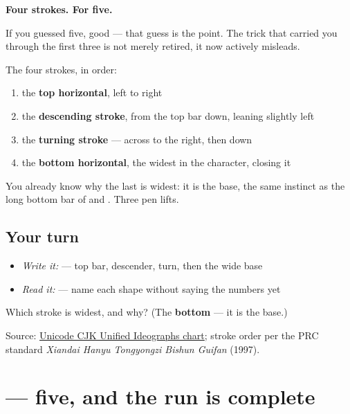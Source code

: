 \begin{quote}
\end{quote}

\textbf{Four strokes. For five.}

If you guessed five, good — that guess is the point. The trick that carried you through the first three is not merely retired, it now actively misleads.

The four strokes, in order:

\begin{enumerate}
\raggedright
  \item the \textbf{top horizontal}, left to right
  \item the \textbf{descending stroke}, from the top bar down, leaning slightly left
  \item the \textbf{turning stroke} — across to the right, then down
  \item the \textbf{bottom horizontal}, the widest in the character, closing it
\end{enumerate}

You already know why the last is widest: it is the base, the same instinct as the long bottom bar of  and . Three pen lifts.

\subsection*{Your turn}
\begin{itemize}
\raggedright
  \item \emph{Write it:}  — top bar, descender, turn, then the wide base
  \item \emph{Read it:}      — name each shape without saying the numbers yet
\end{itemize}

\begin{tcolorbox}[breakable,colback=teal!4,colframe=teal!35!black,title={Before you move on}]
Which stroke is widest, and why? (The \textbf{bottom} — it is the base.)

Source: \href{https://www.unicode.org/charts/PDF/U4E00.pdf}{Unicode CJK Unified Ideographs chart}; stroke order per the PRC standard \emph{Xiandai Hanyu Tongyongzi Bishun Guifan} (1997).
\end{tcolorbox}
\section[\texorpdfstring{\zh{五} (wǔ)}{五 (wǔ)}]{ — five, and the run is complete}

